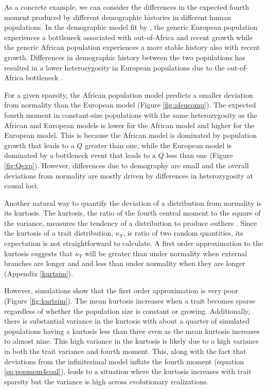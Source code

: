 As a concrete example, we can consider the differences in the expected fourth
moment produced by different demographic histories in different human
populations. In the demographic model fit by \citet{Tennessen2012}, the generic
European population experiences a bottleneck associated with out-of-Africa and
recent growth while the generic African population experiences a more stable
history also with recent growth. Differences in demographic history between the
two populations has resulted in a lower heterozygosity in European populations
due to the out-of-Africa bottleneck \citep{Yu2002}.

For a given sparsity, the African population model predicts a smaller deviation
from normality than the European model (Figure \ref{fig:afeucomp}). The expected
fourth moment in constant-size populations with the same heterozygosity as the
African and European models is lower for the African model and higher for the
European model. This is because the African model is dominated by population
growth that leads to a $Q$ greater than one, while the European model is
dominated by a bottleneck event that leads to a $Q$ less than one
(Figure \ref{fig:Qexp}). However, differences due to demography are small and
the overall deviations from normality are mostly driven by differences in
heterozygosity at causal loci.

Another natural way to quantify the deviation of a distribution from normality
is its kurtosis. The kurtosis, the ratio of the fourth central moment to the
square of the variance, measures the tendency of a distribution to produce
outliers \citep{Westfall2014}. Since the kurtosis of a trait distribution,
$\kappa_Y$, is ratio of two random quantities, its expectation is not
straightforward to calculate. A first order approximation to the kurtosis
suggests that $\kappa_Y$ will be greater than under normality when external
branches are longer and and less than under normality when they are longer
(Appendix \ref{kurtsim}).

However, simulations show that the first order approximation is very poor
(Figure \ref{fig:kurtsim}). The mean kurtosis increases when a trait becomes
sparse regardless of whether the population size is constant or growing.
Additionally, there is substantial variance in the kurtosis with about a quarter
of simulated populations having a kurtosis less than three even as the mean
kurtosis increases to almost nine. This high variance in the kurtosis is likely
due to a high variance in both the trait variance and fourth moment. This, along
with the fact that deviations from the infinitesimal model inflate the fourth
moment (equation \eqref{eq:popmom4coal}), leads to a situation where the
kurtosis increases with trait sparsity but the variance is high across
evolutionary realizations.

